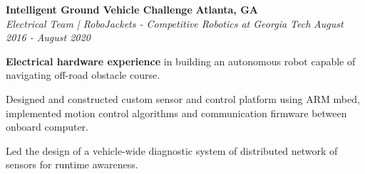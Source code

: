 \headerrow
{\textbf{Intelligent Ground Vehicle Challenge}}	
{\textbf{Atlanta, GA}}
\\
\headerrow
{\emph{Electrical Team | RoboJackets - Competitive Robotics at Georgia Tech}}
{\emph{August 2016 - August 2020}}

\begin{itemize*}
\item \textbf{Electrical hardware experience} in building an autonomous robot capable of navigating off-road obstacle course.
\item Designed and constructed custom sensor and control platform using ARM mbed, implemented motion control algorithms
    and communication firmware between onboard computer.
\item Led the design of a vehicle-wide diagnostic system of distributed network of sensors for runtime awareness. 
\end{itemize*}